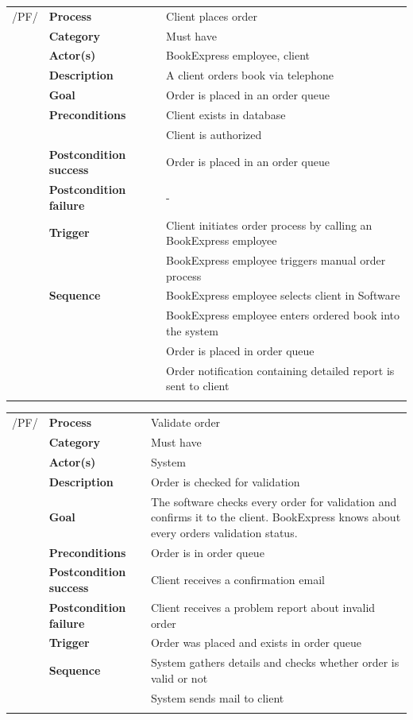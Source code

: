 \documentclass[11pt,a4paper,oneside,svgnames]{report}
\begin{document}
\noindent
\begin{tabular}{p{1.5cm}p{3cm}p{8cm}}
	 /PF/	& \textbf{Process} & Client places order\\ 
		& \textbf{Category} & Must have\\
		& \textbf{Actor(s)} & BookExpress employee, client\\ 
		& \textbf{Description}	 & A client orders book via telephone\\ 
		& \textbf{Goal} & Order is placed in an order queue\\
		& \textbf{Preconditions} & Client exists in database\\
		& & Client is authorized\\
		& \textbf{Postcondition success} & Order is placed in an order queue\\
		& \textbf{Postcondition failure} & -\\
		& \textbf{Trigger} & Client initiates order process by calling an BookExpress employee\\
		& & BookExpress employee triggers manual order process\\
		& \textbf{Sequence} & BookExpress employee selects client in Software\\
		& & BookExpress employee enters ordered book into the system\\
		& & Order is placed in order queue\\
		& & Order notification containing detailed report is sent to client\\
\hfill \\
\end{tabular}

\noindent
\begin{tabular}{p{1.5cm}p{3cm}p{8cm}}
	 /PF/	& \textbf{Process} & Validate order\\ 
		& \textbf{Category} & Must have\\
		& \textbf{Actor(s)} & System\\ 
		& \textbf{Description}	 & Order is checked for validation\\ 
		& \textbf{Goal} & The software checks every order for validation and confirms it to the client. BookExpress knows about every orders validation status.\\
		& \textbf{Preconditions} & Order is in order queue\\
		& \textbf{Postcondition success} & Client receives a confirmation email\\
		& \textbf{Postcondition failure} & Client receives a problem report about invalid order\\
		& \textbf{Trigger} & Order was placed and exists in order queue\\
		& \textbf{Sequence} & System  gathers details and checks whether order is valid or not\\
		& & System sends mail to client\\
\hfill \\
\end{tabular}
\end{document}
